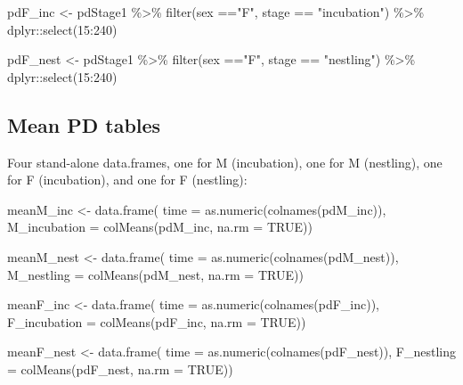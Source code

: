 \documentclass[
]{article}
\newenvironment{Shaded}{\begin{snugshade}}{\end{snugshade}}
\newcommand{\AttributeTok}[1]{\textcolor[rgb]{0.77,0.63,0.00}{#1}}
\newcommand{\ConstantTok}[1]{\textcolor[rgb]{0.00,0.00,0.00}{#1}}
\newcommand{\FunctionTok}[1]{\textcolor[rgb]{0.00,0.00,0.00}{#1}}
\newcommand{\NormalTok}[1]{#1}
\newcommand{\OtherTok}[1]{\textcolor[rgb]{0.56,0.35,0.01}{#1}}
\newcommand{\SpecialCharTok}[1]{\textcolor[rgb]{0.00,0.00,0.00}{#1}}
\newcommand{\StringTok}[1]{\textcolor[rgb]{0.31,0.60,0.02}{#1}}
\begin{document}
\begin{Shaded}
\begin{Highlighting}[]
\NormalTok{pdF\_inc }\OtherTok{\textless{}{-}}\NormalTok{ pdStage1 }\SpecialCharTok{\%\textgreater{}\%}
  \FunctionTok{filter}\NormalTok{(sex }\SpecialCharTok{==}\StringTok{"F"}\NormalTok{, stage }\SpecialCharTok{==} \StringTok{"incubation"}\NormalTok{) }\SpecialCharTok{\%\textgreater{}\%}
\NormalTok{  dplyr}\SpecialCharTok{::}\FunctionTok{select}\NormalTok{(}\StringTok{\textquotesingle{}15\textquotesingle{}}\SpecialCharTok{:}\StringTok{\textquotesingle{}240\textquotesingle{}}\NormalTok{)}
         
\NormalTok{pdF\_nest }\OtherTok{\textless{}{-}}\NormalTok{ pdStage1 }\SpecialCharTok{\%\textgreater{}\%}
  \FunctionTok{filter}\NormalTok{(sex }\SpecialCharTok{==}\StringTok{"F"}\NormalTok{, stage }\SpecialCharTok{==} \StringTok{"nestling"}\NormalTok{) }\SpecialCharTok{\%\textgreater{}\%}
\NormalTok{  dplyr}\SpecialCharTok{::}\FunctionTok{select}\NormalTok{(}\StringTok{\textquotesingle{}15\textquotesingle{}}\SpecialCharTok{:}\StringTok{\textquotesingle{}240\textquotesingle{}}\NormalTok{)}
\end{Highlighting}
\end{Shaded}

\hypertarget{mean-pd-tables}{%
\subsection{Mean PD tables}\label{mean-pd-tables}}

Four stand-alone data.frames, one for M (incubation), one for M
(nestling), one for F (incubation), and one for F (nestling):

\begin{Shaded}
\begin{Highlighting}[]
\NormalTok{meanM\_inc }\OtherTok{\textless{}{-}} \FunctionTok{data.frame}\NormalTok{(}
  \AttributeTok{time =} \FunctionTok{as.numeric}\NormalTok{(}\FunctionTok{colnames}\NormalTok{(pdM\_inc)),}
  \AttributeTok{M\_incubation =} \FunctionTok{colMeans}\NormalTok{(pdM\_inc, }\AttributeTok{na.rm =} \ConstantTok{TRUE}\NormalTok{))}

\NormalTok{meanM\_nest }\OtherTok{\textless{}{-}} \FunctionTok{data.frame}\NormalTok{(}
  \AttributeTok{time =} \FunctionTok{as.numeric}\NormalTok{(}\FunctionTok{colnames}\NormalTok{(pdM\_nest)),}
  \AttributeTok{M\_nestling =} \FunctionTok{colMeans}\NormalTok{(pdM\_nest, }\AttributeTok{na.rm =} \ConstantTok{TRUE}\NormalTok{))}

\NormalTok{meanF\_inc }\OtherTok{\textless{}{-}} \FunctionTok{data.frame}\NormalTok{(}
  \AttributeTok{time =} \FunctionTok{as.numeric}\NormalTok{(}\FunctionTok{colnames}\NormalTok{(pdF\_inc)),}
  \AttributeTok{F\_incubation =} \FunctionTok{colMeans}\NormalTok{(pdF\_inc, }\AttributeTok{na.rm =} \ConstantTok{TRUE}\NormalTok{))}

\NormalTok{meanF\_nest }\OtherTok{\textless{}{-}} \FunctionTok{data.frame}\NormalTok{(}
  \AttributeTok{time =} \FunctionTok{as.numeric}\NormalTok{(}\FunctionTok{colnames}\NormalTok{(pdF\_nest)),}
  \AttributeTok{F\_nestling =} \FunctionTok{colMeans}\NormalTok{(pdF\_nest, }\AttributeTok{na.rm =} \ConstantTok{TRUE}\NormalTok{))}
\end{Highlighting}
\end{Shaded}
\end{document}
